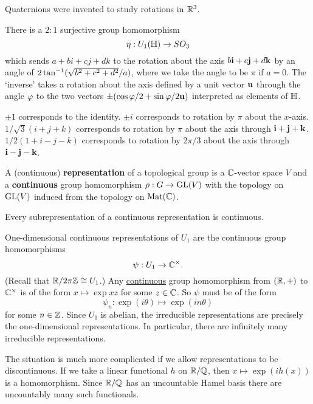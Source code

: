 Quaternions were invented to study rotations in $\mathbb{R}^3$.

\begin{thm}[Hamilton]
  There is a $2:1$ surjective group homomorphism
  \[ \eta: U_1(\mathbb{H}) \to SO_3 \]
  which sends $a+bi+cj+dk$ to the rotation about the axis $b\mathbf{i} + c\mathbf{j} + d\mathbf{k}$ by an angle of $2\tan^{-1}(\sqrt{b^2+c^2+d^2}/a)$, where we take the angle to be $\pi$ if $a=0$.
  The `inverse' takes a rotation about the axis defined by a unit vector $\mathbf{u}$ through the angle $\varphi$ to the two vectors $\pm( \cos\varphi/2 + \sin\varphi/2\mathbf{u})$ interpreted as elements of $\mathbb{H}$.
\end{thm}

\begin{exam}
  \lv
  \begin{enum}
    \io $\pm 1$ corresponds to the identity.
    \io $\pm i$ corresponds to rotation by $\pi$ about the $x$-axis.
    \io $1/\sqrt{3}(i+j+k)$ corresponds to rotation by $\pi$ about the axis through $\mathbf{i}+\mathbf{j}+\mathbf{k}$.
    \io $1/2(1+i-j-k)$ corresponds to rotation by $2\pi/3$ about the axis through $\mathbf{i}-\mathbf{j}-\mathbf{k}$.
  \end{enum}
\end{exam}

\begin{defn}
  A (continuous) \textbf{representation} of a topological group is a $\mathbb{C}$-vector space $V$ and a \textbf{continuous} group homomorphism $\rho: G \to \operatorname{GL}(V)$ with the topology on $\operatorname{GL}(V)$ induced from the topology on $\operatorname{Mat}(\mathbb{C})$.
\end{defn}

\begin{rmk}
  Every subrepresentation of a continuous representation is continuous.
\end{rmk}

\begin{exam}
  One-dimensional continuous representations of $U_1$ are the continuous group homomorphisms
  \[ \psi: U_1 \to \mathbb{C}^\times. \]
  (Recall that $\mathbb{R}/2\pi\mathbb{Z} \cong U_1$.)
  Any \underline{continuous} group homomorphism from $(\mathbb{R},+)$ to $\mathbb{C}^\times$ is of the form $x \mapsto \exp xz$ for some $z \in \mathbb{C}$.
  So $\psi$ must be of the form
  \[ \psi_n: \exp(i\theta) \mapsto \exp(in\theta) \]
  for some $n \in \mathbb{Z}$.
  Since $U_1$ is abelian, the irreducible representations are precisely the one-dimensional representations.
  In particular, there are infinitely many irreducible representations.
\end{exam}

\begin{rmk}
  The situation is much more complicated if we allow representations to be discontinuous.
  If we take a linear functional $h$ on $\mathbb{R}/\mathbb{Q}$, then $x \mapsto \exp(ih(x))$ is a homomorphism.
  Since $\mathbb{R}/\mathbb{Q}$ has an uncountable Hamel basis there are uncountably many such functionals.
\end{rmk}
